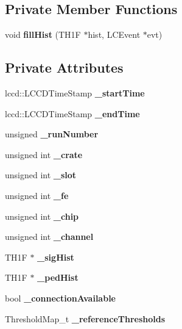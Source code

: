 \subsection*{Private Member Functions}
\begin{DoxyCompactItemize}
\item 
void {\bfseries fillHist} (TH1F $\ast$hist, LCEvent $\ast$evt)\label{classCALICE_1_1multiCalibrator_a0f54d7d5a1e9b4469bc59ae7b2d3a204}

\end{DoxyCompactItemize}
\subsection*{Private Attributes}
\begin{DoxyCompactItemize}
\item 
lccd::LCCDTimeStamp {\bfseries \_\-startTime}\label{classCALICE_1_1multiCalibrator_a33b407cfd46e3ac56bdc30947e0eb2e1}

\item 
lccd::LCCDTimeStamp {\bfseries \_\-endTime}\label{classCALICE_1_1multiCalibrator_a06d7b62ae49be9bad5c7eb8a7f270f58}

\item 
unsigned {\bfseries \_\-runNumber}\label{classCALICE_1_1multiCalibrator_acfcabcaf4253473ac3d99df1f162da5f}

\item 
unsigned int {\bfseries \_\-crate}\label{classCALICE_1_1multiCalibrator_afc05f707dab2f811d755300d480d57f6}

\item 
unsigned int {\bfseries \_\-slot}\label{classCALICE_1_1multiCalibrator_a88106b2a17b0308851dfdace4d9fd8a4}

\item 
unsigned int {\bfseries \_\-fe}\label{classCALICE_1_1multiCalibrator_a7e31fc8c645ee72b61deafacb51ee6b5}

\item 
unsigned int {\bfseries \_\-chip}\label{classCALICE_1_1multiCalibrator_ae8423d1b22561196f45134990b6e3be5}

\item 
unsigned int {\bfseries \_\-channel}\label{classCALICE_1_1multiCalibrator_a1a14cc1103c22d000ea6565619bc98ee}

\item 
TH1F $\ast$ {\bfseries \_\-sigHist}\label{classCALICE_1_1multiCalibrator_a5087ce6fdd939090347791bc86a02025}

\item 
TH1F $\ast$ {\bfseries \_\-pedHist}\label{classCALICE_1_1multiCalibrator_abf5102e26fbe03d997813b06eea13818}

\item 
bool {\bfseries \_\-connectionAvailable}\label{classCALICE_1_1multiCalibrator_adcb7ef44a6a00a92da355ee43dbcc147}

\item 
ThresholdMap\_\-t {\bfseries \_\-referenceThresholds}\label{classCALICE_1_1multiCalibrator_ac2eccfcf6a4b10389fabf83c743a9b0d}

\end{DoxyCompactItemize}


